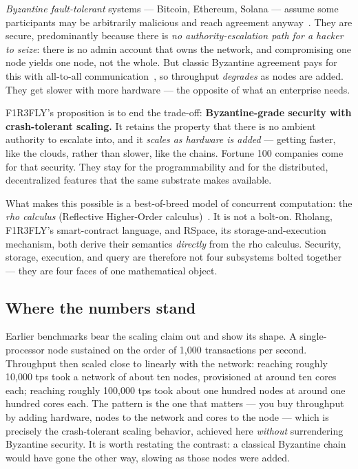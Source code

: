 \documentclass[11pt]{article}
\begin{document}
\emph{Byzantine fault-tolerant} systems --- Bitcoin, Ethereum, Solana --- assume some participants may be arbitrarily malicious and reach agreement anyway~\cite{byzantine}. They are secure, predominantly because there is \emph{no authority-escalation path for a hacker to seize}: there is no admin account that owns the network, and compromising one node yields one node, not the whole. But classic Byzantine agreement pays for this with all-to-all communication~\cite{pbft}, so throughput \emph{degrades} as nodes are added. They get slower with more hardware --- the opposite of what an enterprise needs.

\begin{keybox}
F1R3FLY's proposition is to end the trade-off: \textbf{Byzantine-grade security with crash-tolerant scaling.} It retains the property that there is no ambient authority to escalate into, and it \emph{scales as hardware is added} --- getting faster, like the clouds, rather than slower, like the chains. Fortune 100 companies come for that security. They stay for the programmability and for the distributed, decentralized features that the same substrate makes available.
\end{keybox}

What makes this possible is a best-of-breed model of concurrent computation: the \emph{rho calculus} (Reflective Higher-Order calculus)~\cite{rho}. It is not a bolt-on. Rholang, F1R3FLY's smart-contract language, and RSpace, its storage-and-execution mechanism, both derive their semantics \emph{directly} from the rho calculus. Security, storage, execution, and query are therefore not four subsystems bolted together --- they are four faces of one mathematical object.

\subsection*{Where the numbers stand}

Earlier benchmarks bear the scaling claim out and show its shape. A single-processor node sustained on the order of 1{,}000 transactions per second. Throughput then scaled close to linearly with the network: reaching roughly 10{,}000 tps took a network of about ten nodes, provisioned at around ten cores each; reaching roughly 100{,}000 tps took about one hundred nodes at around one hundred cores each. The pattern is the one that matters --- you buy throughput by adding hardware, nodes to the network and cores to the node --- which is precisely the crash-tolerant scaling behavior, achieved here \emph{without} surrendering Byzantine security. It is worth restating the contrast: a classical Byzantine chain would have gone the other way, slowing as those nodes were added.
\end{document}
